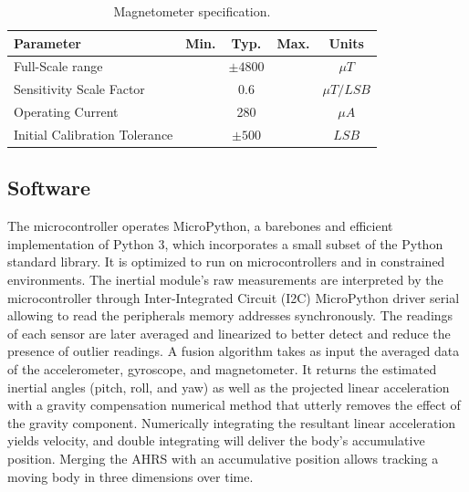 \begin{table}[H]
    \begin{center}
        \begin{tabular}[t]{lcccc}
            \hline
            Parameter                     & Min. & Typ.       & Max. & Units        \\
            \hline
            Full-Scale range              &      & $\pm 4800$ &      & $\mu T$      \\
            Sensitivity Scale Factor      &      & 0.6        &      & $\mu T/ LSB$ \\
            Operating Current             &      & 280        &      & $\mu A$      \\
            Initial Calibration Tolerance &      & $\pm 500$  &      & $LSB$        \\
            \hline
        \end{tabular}
        \caption{Magnetometer specification. }
        \label{tab:magnetometer_specification}
    \end{center}
\end{table}

\subsection{Software}
The microcontroller operates MicroPython, a barebones and efficient implementation of Python 3, which incorporates a small subset of the Python standard library. It is optimized to run on microcontrollers and in constrained environments. The inertial module's raw measurements are interpreted by the microcontroller through Inter-Integrated Circuit (I2C) MicroPython driver serial allowing to read the peripherals memory addresses synchronously. The readings of each sensor are later averaged and linearized to better detect and reduce the presence of outlier readings. A fusion algorithm takes as input the averaged data of the accelerometer, gyroscope, and magnetometer. It returns the estimated inertial angles (pitch, roll, and yaw) as well as the projected linear acceleration with a gravity compensation numerical method that utterly removes the effect of the gravity component. Numerically integrating the resultant linear acceleration yields velocity, and double integrating will deliver the body's accumulative position. Merging the AHRS with an accumulative position allows tracking a moving body in three dimensions over time.

